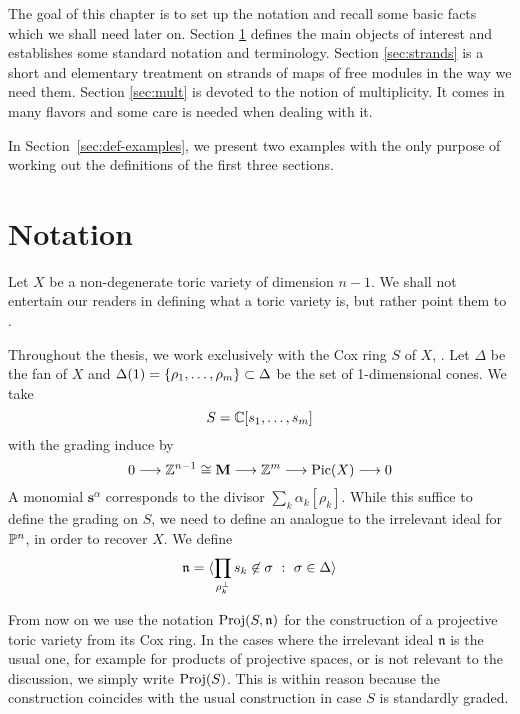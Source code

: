 \documentclass[fleqn,reqno]{amsart}
\begin{document}



\begin{paragraf*}
The goal of this chapter is to set up the notation and recall some basic facts
which we shall need later on.
Section \ref{sec:notation} defines the main objects of interest and establishes some
standard notation and terminology.
Section \ref{sec:strands} is a short and elementary treatment on strands of maps of free modules
in the way we need them.
Section \ref{sec:mult} is devoted to the notion of multiplicity.
It comes in many flavors and some care is needed when dealing with it.
\end{paragraf*}

\begin{paragraf*}
In Section~\ref{sec:def-examples},
we present two examples with the only purpose of working out
the definitions of the first three sections.
\end{paragraf*}



\section{Notation}
\label{sec:notation}

\begin{paragraf}
\label{par:cox-ring}
Let $X$ be a non-degenerate toric variety of dimension $n-1$.
We shall not entertain our readers in defining what a toric variety is,
but rather point them to \citet{CLSh11}.

Throughout the thesis,
we work exclusively with the Cox ring $S$ of $X$, \citet{Cox-93}.
Let $\Delta$ be the fan of $X$ and
$\Delta(1)=\{\rho_1,\ldots,\rho_m\}\subset\Delta$ be the set of 1-dimensional cones.
We take
\[
	S=\mathbb{C}[s_1,\ldots,s_m]
\]
with the grading induce by
\[
	0\longrightarrow\mathbb{Z}^{n-1}\cong\mathbf M\longrightarrow\mathbb{Z}^m\longrightarrow\operatorname{Pic}(X)\longrightarrow0
\]
A monomial $\mathbf s^\alpha$ corresponds to the divisor $\sum_k \alpha_k[\rho_k]$.
While this suffice to define the grading on $S$,
we need to define an analogue to the irrelevant ideal for $\mathbb{P}^n$,
in order to recover $X$.
We define
\[
	\mathfrak{n}=\langle \prod_{\rho_k^\perp}s_k\not\in\sigma~:~\sigma\in\Delta\rangle
\]
\end{paragraf}

\begin{paragraf}
From now on we use the notation $\operatorname{Proj}(S,\mathfrak n)$ for the construction of a projective toric variety from
its Cox ring. In the cases where the irrelevant ideal $\mathfrak n$ is the usual one,
for example for products of projective spaces, or is not relevant to the discussion,
we simply write $\operatorname{Proj}(S)$.
This is within reason because the construction coincides with the usual construction
in case $S$ is standardly graded.
\end{paragraf}
\end{document}
